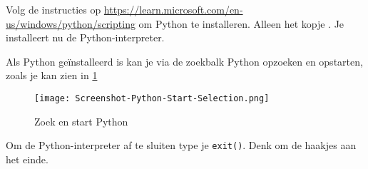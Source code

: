 Volg de instructies op \url{https://learn.microsoft.com/en-us/windows/python/scripting} om Python te installeren. Alleen het kopje . Je installeert nu de Python-interpreter.

Als Python ge\"installeerd is kan je via de zoekbalk Python opzoeken en opstarten, zoals je kan zien in \ref{fig:pythonint}

\begin{figure}[H]
\texttt{[image: Screenshot-Python-Start-Selection.png]}
        \caption{Zoek en start Python}
        \label{fig:pythonint}
\end{figure}

Om de Python-interpreter af te sluiten type je \texttt{exit()}. Denk om de haakjes aan het einde.
